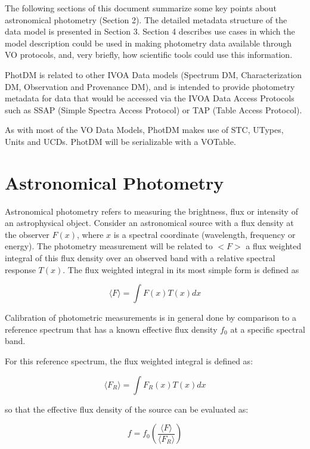 \documentclass[11pt,a4paper]{ivoa}
\begin{document}
The following sections of this document summarize some key points
about astronomical photometry (Section 2). The detailed metadata
structure of the data model is presented in Section 3. Section 4
describes use cases in which the model description could be used in
making photometry data available through VO protocols, and, very briefly,
how scientific tools could use this information.


PhotDM is related to other IVOA Data models (Spectrum DM, Characterization DM,
Observation and Provenance DM),  and is intended to provide photometry
metadata for data that would be accessed via the IVOA Data Access Protocols
such as SSAP (Simple Spectra Access Protocol) or TAP (Table Access Protocol).

As with most of the VO Data Models, PhotDM makes use of STC, UTypes, Units
and UCDs. PhotDM will be serializable with a VOTable.

\section{Astronomical Photometry}
Astronomical photometry refers to measuring the brightness, flux or
intensity of an astrophysical object. Consider an astronomical source
with a flux density at the observer $F(x)$, where $x$ is a spectral coordinate
(wavelength, frequency or energy).  The photometry measurement will be related
to $<F>$ a flux weighted integral of this flux density over an observed band
with a relative spectral response $T(x)$. The flux weighted integral in its most
simple form is defined as


\begin{equation} \label{eq:1}
\langle F\rangle = \int F(x)T(x)dx
\end{equation}

Calibration of photometric measurements is in general done by comparison to a
reference spectrum that has a known effective flux density $f_0$ at a specific
spectral band.


For this reference spectrum, the flux weighted integral is defined as:

\begin{equation} \label{eq:2}
\langle F_R \rangle= \int F_R (x)T(x)dx
\end{equation}


so that the effective flux density of the source can be evaluated as:

\begin{equation} \label{eq:3}
f = f_0 ( \frac{\langle F\rangle }{\langle F_R \rangle } )
\end{equation}
\end{document}
